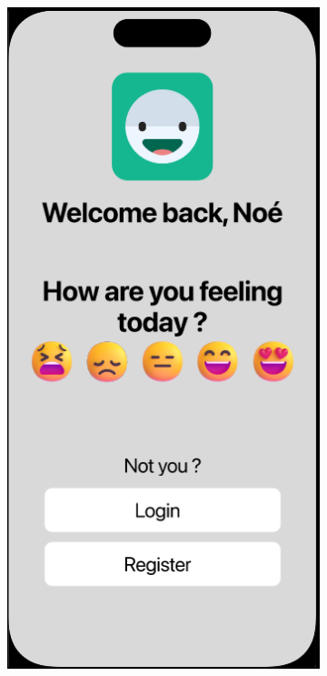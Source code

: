 \documentclass[11pt]{article}
\begin{document}
\begin{figure}[h!]
     \centering
     \begin{subfigure}[b]{0.3\textwidth}
         \centering
         \includegraphics[width=\textwidth]{figures/start screen.PNG}

\end{subfigure}
\end{figure}
\end{document}
